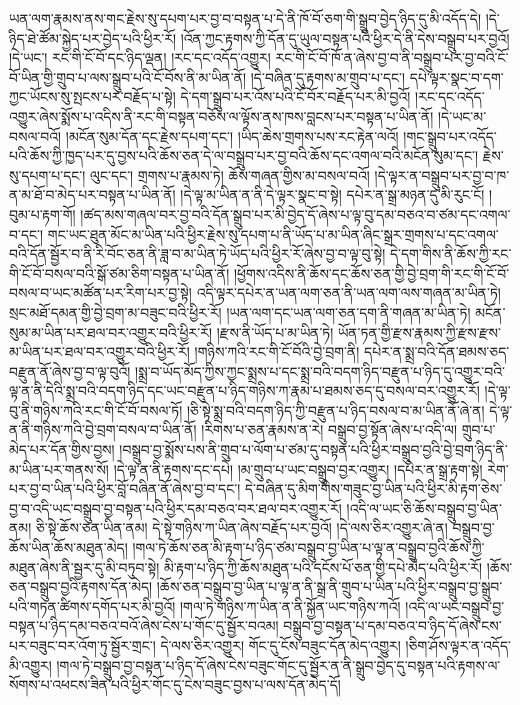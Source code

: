 ཡན་ལག་རྣམས་ནས་གང་རྗེས་སུ་དཔག་པར་བྱ་བ་བསྟན་པ་དེ་ནི་ཁོ་བོ་ཅག་གི་སྒྲུབ་བྱེད་ཉིད་དུ་མི་འདོད་དེ། །དེ་ཉིད་ཐེ་ཚོམ་སྐྱེད་པར་བྱེད་པའི་ཕྱིར་རོ། །འོན་ཀྱང་རྟགས་ཀྱི་དོན་དུ་ཡུལ་བསྟན་པའི་ཕྱིར་དེ་ནི་དེས་བསྒྲུབ་པར་བྱའོ། །དེ་ཡང་། རང་གི་ངོ་བོ་དང་ཉིད་ལྡན། །རང་དང་འདོད་འགྱུར། རང་གི་ངོ་བོ་ཁོ་ན་ཞེས་བྱ་བ་ནི་བསྒྲུབ་པར་བྱ་བའི་ངོ་བོ་ཡིན་གྱི་གྲུབ་པ་ལས་སྒྲུབ་པའི་ངོ་བོས་ནི་མ་ཡིན་ནོ། །དེ་བཞིན་དུ་རྟགས་མ་གྲུབ་པ་དང་། དཔེ་ལྟར་སྣང་བ་དག་ཀྱང་ཡོངས་སུ་སྤངས་པར་བརྗོད་པ་སྟེ། དེ་དག་སྒྲུབ་པར་འོས་པའི་ངོ་བོར་བརྗོད་པར་མི་བྱའོ། །རང་དང་འདོད་འགྱུར་ཞེས་སྨོས་པ་འདིས་ནི་རང་གི་བསྟན་བཅོས་ལ་ལྟོས་ནས་ཁས་བླངས་པར་བསྟན་པ་ཡིན་ནོ། །དེ་ཡང་མ་བསལ་བའོ། །མངོན་སུམ་དོན་དང་རྗེས་དཔག་དང་། །ཡིད་ཆེས་གྲགས་པས་རང་རྟེན་ལའོ། །གང་སྒྲུབ་པར་འདོད་པའི་ཆོས་ཀྱི་ཁྱད་པར་དུ་བྱས་པའི་ཆོས་ཅན་དེ་ལ་བསྒྲུབ་པར་བྱ་བའི་ཆོས་དང་འགལ་བའི་མངོན་སུམ་དང་། རྗེས་སུ་དཔག་པ་དང་། ལུང་དང་། གྲགས་པ་རྣམས་ཏེ། ཆོས་གཞན་གྱིས་མ་བསལ་བའོ། །དེ་ལྟར་ན་བསྒྲུབ་པར་བྱ་བ་ཁ་ན་མ་ཐོ་བ་མེད་པར་བསྟན་པ་ཡིན་ནོ། །དེ་ལྟ་མ་ཡིན་ན་ནི་དེ་ལྟར་སྣང་བ་སྟེ། དཔེར་ན་སྒྲ་མཉན་དུ་མི་རུང་ངོ། །བུམ་པ་རྟག་གོ། །ཚད་མས་གཞལ་བར་བྱ་བའི་དོན་སྒྲུབ་པར་མི་བྱེད་དོ་ཞེས་པ་ལྟ་བུ་དམ་བཅའ་བ་ཙམ་དང་འགལ་བ་དང་། གང་ཡང་ཐུན་མོང་མ་ཡིན་པའི་ཕྱིར་རྗེས་སུ་དཔག་པ་ནི་ཡོད་པ་མ་ཡིན་ཞིང་སྒྲར་གྲགས་པ་དང་འགལ་བའི་དོན་སྦྱོར་བ་ནི་རི་བོང་ཅན་ནི་ཟླ་བ་མ་ཡིན་ཏེ་ཡོད་པའི་ཕྱིར་རོ་ཞེས་བྱ་བ་ལྟ་བུ་སྟེ། དེ་དག་གིས་ནི་ཆོས་ཀྱི་རང་གི་ངོ་བོ་བསལ་བའི་སྒོ་ཙམ་ཅིག་བསྟན་པ་ཡིན་ནོ། །ཕྱོགས་འདིས་ནི་ཆོས་དང་ཆོས་ཅན་གྱི་བྱེ་བྲག་གི་རང་གི་ངོ་བོ་བསལ་བ་ཡང་མཚོན་པར་རིག་པར་བྱ་སྟེ། འདི་ལྟར་དཔེར་ན་ཡན་ལག་ཅན་ནི་ཡན་ལག་ལས་གཞན་མ་ཡིན་ཏེ། སྲང་མཐོ་དམན་གྱི་བྱེ་བྲག་མ་བཟུང་བའི་ཕྱིར་རོ། །ཡན་ལག་དང་ཡན་ལག་ཅན་དག་ནི་གཞན་མ་ཡིན་ཏེ། མངོན་སུམ་མ་ཡིན་པར་ཐལ་བར་འགྱུར་བའི་ཕྱིར་རོ། །རྫས་ནི་ཡོད་པ་མ་ཡིན་ཏེ། ཡོན་ཏན་གྱི་རྫས་རྣམས་ཀྱི་རྫས་རྫས་མ་ཡིན་པར་ཐལ་བར་འགྱུར་བའི་ཕྱིར་རོ། །གཉིས་ཀའི་རང་གི་ངོ་བོའི་བྱེ་བྲག་ནི། དཔེར་ན་སྨྲ་བའི་དོན་ཐམས་ཅད་བརྫུན་ནོ་ཞེས་བྱ་བ་ལྟ་བུའོ། །སྨྲ་བ་ཡོད་མོད་ཀྱིས་ཀྱང་སྨྲས་པ་དང་སྨྲ་བའི་བདག་ཉིད་བརྫུན་པ་ཉིད་དུ་འགྱུར་བའི་ལྟ་ན་ནི་དེའི་སྨྲ་བའི་བདག་ཉིད་དང་ཡང་བརྫུན་པ་ཉིད་གཉིས་ཀ་རྣམ་པ་ཐམས་ཅད་དུ་བསལ་བར་འགྱུར་རོ། །དེ་ལྟ་བུ་ནི་གཉིས་ཀའི་རང་གི་ངོ་བོ་བསལ་ཏོ། །ཅི་སྟེ་སྨྲ་བའི་བདག་ཉིད་ཀྱི་བརྫུན་པ་ཉིད་བསལ་བ་མ་ཡིན་ནོ་ཞེ་ན། དེ་ལྟ་ན་ནི་གཉིས་ཀའི་བྱེ་བྲག་བསལ་བ་ཡིན་ནོ། །རིགས་པ་ཅན་རྣམས་ན་རེ། བསྒྲུབ་བྱ་སྟོན་ཞེས་པ་འདི་ལ། གྲུབ་པ་མེད་པར་དོན་གྱིས་བྱས། །བསྒྲུབ་བྱ་སྨོས་པས་ནི་གྲུབ་པ་ལོག་པ་ཙམ་དུ་བསྟན་པའི་ཕྱིར་བསྒྲུབ་བྱའི་བྱེ་བྲག་ཉིད་ནི་མ་ཡིན་པར་གནས་སོ། །དེ་ལྟ་ན་ནི་རྟགས་དང་དཔེ། །མ་གྲུབ་པ་ཡང་བསྒྲུབ་བྱར་འགྱུར། །དཔེར་ན་སྒྲ་རྟག་སྟེ། རེག་པར་བྱ་བ་ཡིན་པའི་ཕྱིར་བློ་བཞིན་ནོ་ཞེས་བྱ་བ་དང་། དེ་བཞིན་དུ་མིག་གིས་གཟུང་བྱ་ཡིན་པའི་ཕྱིར་མི་རྟག་ཅེས་བྱ་བ་འདི་ཡང་བསྒྲུབ་བྱ་བསྟན་པའི་ཕྱིར་དམ་བཅའ་བར་ཐལ་བར་འགྱུར་རོ། །འདི་ལ་ཡང་ཅི་ཆོས་བསྒྲུབ་བྱ་ཡིན་ནམ། ཅི་སྟེ་ཆོས་ཅན་ཡིན་ནམ། དེ་སྟེ་གཉིས་ཀ་ཡིན་ཞེས་བརྗོད་པར་བྱའོ། །དེ་ལས་ཅིར་འགྱུར་ཞེ་ན། བསྒྲུབ་བྱ་ཆོས་ཡིན་ཆོས་མཐུན་མེད། །གལ་ཏེ་ཆོས་ཅན་མི་རྟག་པ་ཉིད་ཙམ་བསྒྲུབ་བྱ་ཡིན་པ་ལྟ་ན་བསྒྲུབ་བྱའི་ཆོས་ཀྱི་མཐུན་ཞེས་ནི་སྦྱར་དུ་མི་བཏུབ་སྟེ། མི་རྟག་པ་ཉིད་ཀྱི་ཆོས་མཐུན་པའི་དངོས་པོ་ཅན་གྱི་དཔེ་མེད་པའི་ཕྱིར་རོ། །ཆོས་ཅན་བསྒྲུབ་བྱའི་རྟགས་དོན་མེད། །ཆོས་ཅན་བསྒྲུབ་བྱ་ཡིན་པ་ལྟ་ན་ནི་སྒྲ་ནི་གྲུབ་པ་ཡིན་པའི་ཕྱིར་བསྒྲུབ་བྱ་སྒྲུབ་པའི་གཏན་ཚིགས་དགོད་པར་མི་བྱའོ། །གལ་ཏེ་གཉིས་ཀ་ཡིན་ན་ནི་སྐྱོན་ཡང་གཉིས་ཀའོ། །འདི་ལ་ཡང་བསྒྲུབ་བྱ་བསྟན་པ་ཉིད་དམ་བཅའ་བའོ་ཞེས་ངེས་པ་གོང་དུ་སྦྱོར་བའམ། བསྒྲུབ་བྱ་བསྟན་པ་དམ་བཅའ་བ་ཉིད་དོ་ཞེས་ངས་པར་བཟུང་བར་འོག་ཏུ་སྦྱོར་གྲང་། དེ་ལས་ཅིར་འགྱུར། གོང་དུ་ངོས་བཟུང་དོན་མེད་འགྱུར། །ཅིག་ཤོས་ལྟར་ན་འདོད་མི་འགྱུར། །གལ་ཏེ་བསྒྲུབ་བྱ་བསྟན་པ་ཉིད་དོ་ཞེས་ངེས་བཟུང་གོང་དུ་སྦྱོར་ན་ནི་སྒྲུབ་བྱེད་དུ་བསྟན་པའི་རྟགས་ལ་སོགས་པ་འཕངས་ཟིན་པའི་ཕྱིར་གོང་དུ་ངེས་བཟུང་བྱས་པ་ལས་དོན་མེད་དོ། 